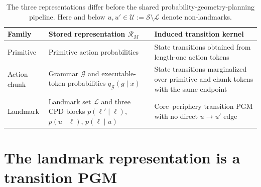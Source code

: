 \documentclass[11pt]{article}
\begin{document}
\begin{table}[htbp]
\centering
\small
\begin{tabularx}{\textwidth}{lYY}
\toprule
Family & Stored representation $\mathcal R_M$ & Induced transition kernel \\
\midrule
Primitive & Primitive action probabilities & State transitions obtained from
length-one action tokens \\
Action chunk & Grammar $\mathcal G$ and executable-token probabilities
$q_{\mathcal G}(g\mid x)$ & State transitions marginalized over primitive and chunk
tokens with the same endpoint \\
Landmark & Landmark set $\mathcal L$ and three CPD blocks
$p(\ell'\mid\ell)$, $p(u\mid\ell)$, $p(\ell\mid u)$ &
Core--periphery transition PGM with no direct $u\to u'$ edge \\
\bottomrule
\end{tabularx}
\caption{The three representations differ before the shared probability-geometry-planning
pipeline. Here and below $u,u'\in\mathcal U:=\mathcal S\setminus\mathcal L$ denote
non-landmarks.}
\label{tab:families}
\end{table}

\section{The landmark representation is a transition PGM}
\label{sec:landmark}
\end{document}
